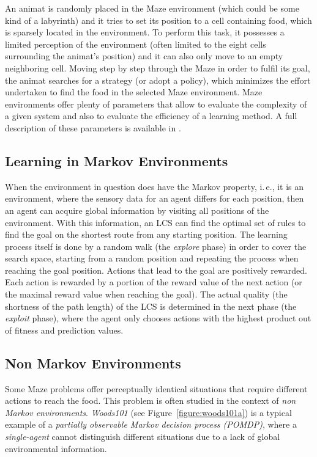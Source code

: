 An animat is randomly placed in the Maze environment (which could be some kind of a labyrinth) and it tries to set its position to a cell containing food, which is sparsely located in the environment. To perform this task, it possesses a limited perception of the environment (often limited to the eight cells surrounding the animat's position) and it can also only move to an empty neighboring cell. Moving step by step through the Maze in order to fulfil its goal, the animat searches for a strategy (or adopt a policy), which minimizes the effort undertaken to find the food in the selected Maze environment. Maze environments offer plenty of parameters that allow to evaluate the complexity of a given system and also to evaluate the efficiency of a learning method. A full description of these parameters is available in \cite{BZ05}.

\subsection{Learning in Markov Environments} %
\label{subsection:learning-markov}

When the environment in question does have the Markov property, i.\,e., it is an environment, where the sensory data for an agent differs for each position, then an agent can acquire global information by visiting all positions of the environment. With this information, an LCS can find the optimal set of rules to find the goal on the shortest route from any starting position. The learning process itself is done by a random walk (the \emph{explore} phase) in order to cover the search space, starting from a random position and repeating the process when reaching the goal position. Actions that lead to the goal are positively rewarded. Each action is rewarded by a portion of the reward value of the next action (or the maximal reward value when reaching the goal). The actual quality (the shortness of the path length) of the LCS is determined in the next phase (the \emph{exploit} phase), where the agent only chooses actions with the highest product out of fitness and prediction values.

\subsection{Non Markov Environments}
\label{subsection:non-markov-environments}

Some Maze problems offer perceptually identical situations that require different actions to reach the food. This problem is often studied in the context of \emph{non Markov environments}. \emph{Woods101} (see Figure~\ref{figure:woods101a}) is a typical example of a \emph{partially observable Markov decision process (POMDP)}, where a \emph{single-agent} cannot distinguish different situations due to a lack of global environmental information. 


